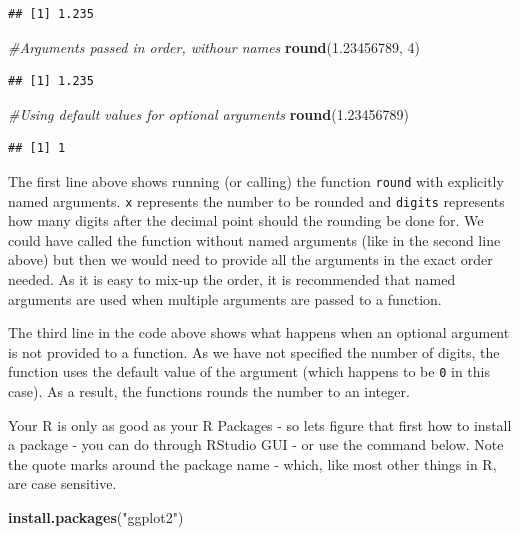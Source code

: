 \documentclass[]{krantz}
\makeatletter
\newenvironment{Shaded}{\begin{snugshade}}{\end{snugshade}}
\newcommand{\KeywordTok}[1]{\textcolor[rgb]{0.27,0.27,0.27}{\textbf{#1}}}
\newcommand{\DecValTok}[1]{\textcolor[rgb]{0.06,0.06,0.06}{#1}}
\newcommand{\FloatTok}[1]{\textcolor[rgb]{0.06,0.06,0.06}{#1}}
\newcommand{\StringTok}[1]{\textcolor[rgb]{0.5,0.5,0.5}{#1}}
\newcommand{\CommentTok}[1]{\textcolor[rgb]{0.56,0.35,0.01}{\textit{#1}}}
\newcommand{\NormalTok}[1]{#1}
\newenvironment{kframe}{%
\medskip{}
\setlength{\fboxsep}{.8em}
 \def\at@end@of@kframe{}%
 \ifinner\ifhmode%
  \def\at@end@of@kframe{\end{minipage}}%
  \begin{minipage}{\columnwidth}%
 \fi\fi%
 \def\FrameCommand##1{\hskip\@totalleftmargin \hskip-\fboxsep
 \colorbox{shadecolor}{##1}\hskip-\fboxsep
     \hskip-\linewidth \hskip-\@totalleftmargin \hskip\columnwidth}%
 \MakeFramed {\advance\hsize-\width
   \@totalleftmargin\z@ \linewidth\hsize
   \@setminipage}}%
 {\par\unskip\endMakeFramed%
 \at@end@of@kframe}
\renewenvironment{Shaded}{\begin{kframe}}{\end{kframe}}
\theoremstyle{definition}
\theoremstyle{definition}
\theoremstyle{definition}
\theoremstyle{remark}
\makeatother
\begin{document}
\begin{verbatim}
## [1] 1.235
\end{verbatim}

\begin{Shaded}
\begin{Highlighting}[]
\CommentTok{#Arguments passed in order, withour names}
\KeywordTok{round}\NormalTok{(}\FloatTok{1.23456789}\NormalTok{, }\DecValTok{4}\NormalTok{)}
\end{Highlighting}
\end{Shaded}

\begin{verbatim}
## [1] 1.235
\end{verbatim}

\begin{Shaded}
\begin{Highlighting}[]
\CommentTok{#Using default values for optional arguments}
\KeywordTok{round}\NormalTok{(}\FloatTok{1.23456789}\NormalTok{) }
\end{Highlighting}
\end{Shaded}

\begin{verbatim}
## [1] 1
\end{verbatim}

The first line above shows running (or calling) the function
\texttt{round} with explicitly named arguments. \texttt{x} represents
the number to be rounded and \texttt{digits} represents how many digits
after the decimal point should the rounding be done for. We could have
called the function without named arguments (like in the second line
above) but then we would need to provide all the arguments in the exact
order needed. As it is easy to mix-up the order, it is recommended that
named arguments are used when multiple arguments are passed to a
function.

The third line in the code above shows what happens when an optional
argument is not provided to a function. As we have not specified the
number of digits, the function uses the default value of the argument
(which happens to be \texttt{0} in this case). As a result, the
functions rounds the number to an integer.

Your R is only as good as your R Packages - so lets figure that first
how to install a package - you can do through RStudio GUI - or use the
command below. Note the quote marks around the package name - which,
like most other things in R, are case sensitive.

\begin{Shaded}
\begin{Highlighting}[]
\KeywordTok{install.packages}\NormalTok{(}\StringTok{"ggplot2"}\NormalTok{)}
\end{Highlighting}
\end{Shaded}
\end{document}
